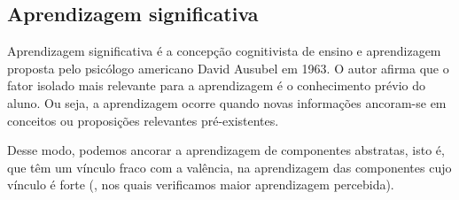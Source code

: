 \subsection{Aprendizagem significativa}\label{sec:as}

Aprendizagem significativa \cite{Pelizzari2002} é a concepção cognitivista de ensino e aprendizagem proposta pelo psicólogo americano David Ausubel em 1963.
O autor afirma que o fator isolado mais relevante para a aprendizagem é o conhecimento prévio do aluno.
Ou seja, a aprendizagem ocorre quando novas informações ancoram-se em conceitos ou proposições relevantes pré-existentes.

Desse modo, podemos ancorar a aprendizagem de componentes abstratas, isto é, que têm um vínculo fraco com a valência, na aprendizagem das componentes cujo vínculo é forte (\ie, nos quais verificamos maior aprendizagem percebida).

